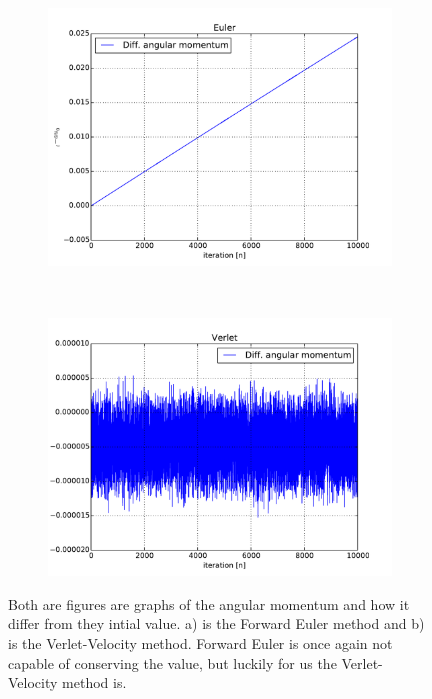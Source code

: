 \begin{figure}[H]
    \centering
    \begin{subfigure}{0.5\textwidth}
        \centering
        \includegraphics[width=\linewidth]{result/bilder/ang-momentum-euler.pdf}
        \caption{}
    \end{subfigure}%
    ~ 
    \begin{subfigure}{0.5\textwidth}
        \centering
        \includegraphics[width=\linewidth]{result/bilder/ang-momentum-verlet.pdf}
        \caption{}
    \end{subfigure}
    \caption{Both are figures are graphs of the angular momentum and how it differ from they intial value. a) is the Forward Euler method and b) is the Verlet-Velocity method. Forward Euler is once again not capable of conserving the value, but luckily for us the Verlet-Velocity method is. 
    }
    \label{fig:conserved-ang}
\end{figure}















